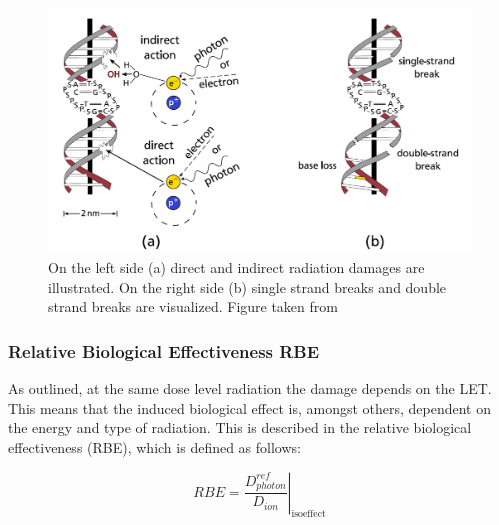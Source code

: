 \begin{figure}[H]
\begin{center}
\includegraphics[scale=0.5]{./teile/introduction/SSB_DSB.png}
\caption{On the left side (a) direct and indirect radiation damages are illustrated. On the right side (b) single strand breaks and 
double strand breaks are visualized. Figure taken from \cite{Ric12}}
\end{center}
\label{ida}
\end{figure}



\subsubsection{Relative Biological Effectiveness RBE}

As outlined, at the same dose level radiation the damage depends on the LET.  This means that the induced biological effect 
is, amongst others, dependent on the energy and type of radiation. This is described in the relative biological effectiveness (RBE), 
which is defined as follows:

\begin{equation}
 RBE = \left.\frac{D^{ref}_{photon}}{D_{ion}} \right|_{\mathrm{isoeffect}}
\end{equation}

